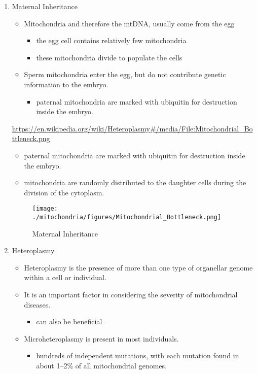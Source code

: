 \documentclass{scrartcl}
\begin{document}
\begin{enumerate}
\item Maternal Inheritance
\label{sec:org5c0cc46}
\begin{itemize}
\item Mitochondria and therefore the mtDNA, usually come from the egg
\begin{itemize}
\item the egg cell contains relatively few mitochondria
\item these mitochondria divide to populate the cells
\end{itemize}
\item Sperm mitochondria enter the egg, but do not contribute genetic
information to the embryo.
\begin{itemize}
\item paternal mitochondria are marked with ubiquitin for destruction
inside the embryo.
\end{itemize}
\end{itemize}
\url{https://en.wikipedia.org/wiki/Heteroplasmy\#/media/File:Mitochondrial\_Bottleneck.png}

\begin{itemize}
\item paternal mitochondria are marked with ubiquitin for destruction
inside the embryo.
\item mitochondria are randomly distributed to the daughter cells during
the division of the cytoplasm.
\end{itemize}

\begin{figure}[htbp]
\centering
\texttt{[image: ./mitochondria/figures/Mitochondrial\_Bottleneck.png]}
\caption[mom]{\label{fig:org8b7f536}
Maternal Inheritance}
\end{figure}

\item Heteroplasmy
\label{sec:orgd2bb450}

\begin{itemize}
\item Heteroplasmy is the presence of more than one type of organellar
genome within a cell or individual.

\item It is an important factor in considering the severity of
mitochondrial diseases.
\begin{itemize}
\item can also be beneficial
\end{itemize}

\item Microheteroplasmy is present in most individuals.
\begin{itemize}
\item hundreds of independent mutations, with each mutation found in
about 1–2\% of all mitochondrial genomes.
\end{itemize}
\end{itemize}



\end{enumerate}
\end{document}
